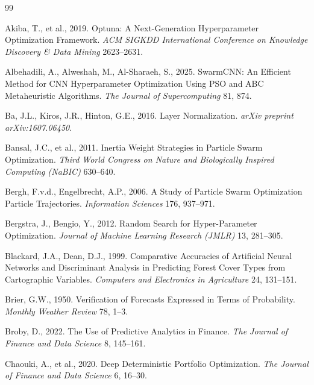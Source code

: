 
\begin{thebibliography}{99}

Akiba, T., et al., 2019. Optuna: A Next-Generation Hyperparameter Optimization Framework. \textit{ACM SIGKDD International Conference on Knowledge Discovery \& Data Mining} 2623–2631.

Albehadili, A., Alweshah, M., Al-Sharaeh, S., 2025. SwarmCNN: An Efficient Method for CNN Hyperparameter Optimization Using PSO and ABC Metaheuristic Algorithms. \textit{The Journal of Supercomputing} 81, 874.

Ba, J.L., Kiros, J.R., Hinton, G.E., 2016. Layer Normalization. \textit{arXiv preprint arXiv:1607.06450}.

Bansal, J.C., et al., 2011. Inertia Weight Strategies in Particle Swarm Optimization. \textit{Third World Congress on Nature and Biologically Inspired Computing (NaBIC)} 630–640.

Bergh, F.v.d., Engelbrecht, A.P., 2006. A Study of Particle Swarm Optimization Particle Trajectories. \textit{Information Sciences} 176, 937–971.

Bergstra, J., Bengio, Y., 2012. Random Search for Hyper-Parameter Optimization. \textit{Journal of Machine Learning Research (JMLR)} 13, 281–305.

Blackard, J.A., Dean, D.J., 1999. Comparative Accuracies of Artificial Neural Networks and Discriminant Analysis in Predicting Forest Cover Types from Cartographic Variables. \textit{Computers and Electronics in Agriculture} 24, 131–151.

Brier, G.W., 1950. Verification of Forecasts Expressed in Terms of Probability. \textit{Monthly Weather Review} 78, 1–3.

Broby, D., 2022. The Use of Predictive Analytics in Finance. \textit{The Journal of Finance and Data Science} 8, 145–161.

Chaouki, A., et al., 2020. Deep Deterministic Portfolio Optimization. \textit{The Journal of Finance and Data Science} 6, 16–30.


\end{thebibliography}
